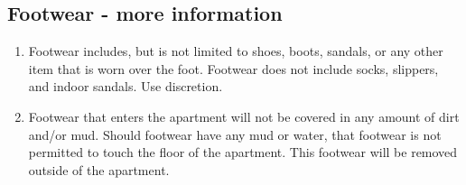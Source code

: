 \documentclass[10pt]{article}
\begin{document}
\subsection{Footwear - more information}
\begin{enumerate}
	\item Footwear includes, but is not limited to shoes, boots, sandals, or any other item that is worn over the foot. Footwear does not include socks, slippers, and indoor sandals. Use discretion.
	\item Footwear that enters the apartment will not be covered in any amount of dirt and/or mud. Should footwear have any mud or water, that footwear is not permitted to touch the floor of the apartment. This footwear will be removed outside of the apartment.
	
\end{enumerate}
\end{document}
